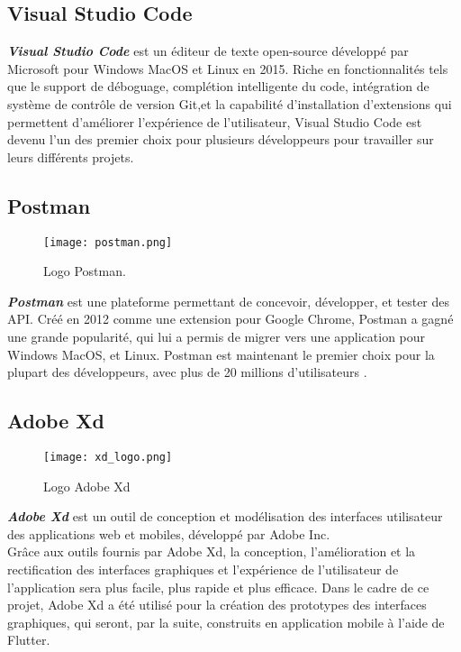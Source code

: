 \subsection{Visual Studio Code}
\textit{\textbf{Visual Studio Code}} \cite{vscode} est un éditeur de texte open-source développé par Microsoft \cite{microsoft} pour Windows MacOS et Linux en 2015. Riche en fonctionnalités tels que le support de déboguage, complétion intelligente du code, intégration de système de contrôle de version Git,et la capabilité d'installation d'extensions qui permettent d'améliorer l'expérience de l'utilisateur, Visual Studio Code est devenu l'un des premier choix pour plusieurs développeurs pour travailler sur leurs différents projets.
\subsection{Postman}
\begin{figure}[H]
    \centering
    \texttt{[image: postman.png]}
    \vspace{1cm}
    \captionsetup{justification=centering}
    \caption{Logo Postman.}
    \label{fig:postman_logo}
\end{figure}
\textit{\textbf{Postman}} \cite{postman} est une plateforme permettant de concevoir, développer, et tester des API. Créé en 2012 comme une extension pour Google Chrome, Postman a gagné une grande popularité, qui lui a permis de migrer vers une application pour Windows MacOS, et Linux. Postman est maintenant le premier choix pour la plupart des développeurs, avec plus de 20 millions d'utilisateurs \cite{postman_users}.
\subsection{Adobe Xd}
\vspace{1cm}
\begin{figure}[H]
    \centering
    \texttt{[image: xd\_logo.png]}
    \vspace{1cm}
    \captionsetup{justification=centering}

    \caption{Logo Adobe Xd}
    \label{fig:xd_logo}
\end{figure}
\textit{\textbf{Adobe Xd}} \cite{adobe_xd} est un outil de conception et modélisation des interfaces utilisateur des applications web et mobiles, développé par Adobe Inc.\\
\noindent Grâce aux outils fournis par Adobe Xd, la conception, l'amélioration et la rectification des interfaces graphiques et l'expérience de l'utilisateur de l'application sera plus facile, plus rapide et plus efficace.
\noindent Dans le cadre de ce projet, Adobe Xd a été utilisé pour la création des prototypes des interfaces graphiques, qui seront, par la suite, construits en application mobile à l'aide de Flutter.
